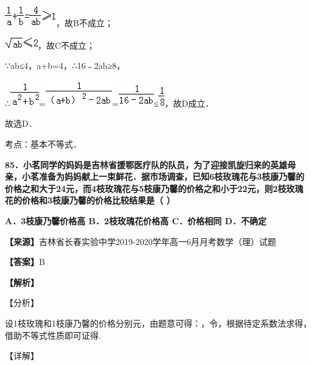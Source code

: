 \documentclass[
]{article}
\begin{document}
\includegraphics[width=0.87535in,height=0.36473in]{Fig//media/image860.png}，故B不成立；

\includegraphics[width=0.56273in,height=0.18758in]{Fig//media/image861.png}，故C不成立；

∵ab≤4，a+b=4，∴16﹣2ab≥8，

∴\includegraphics[width=0.48978in,height=0.42726in]{Fig//media/image862.png}=\includegraphics[width=1.13588in,height=0.4481in]{Fig//media/image863.png}=\includegraphics[width=0.60441in,height=0.39599in]{Fig//media/image864.png}≤\includegraphics[width=0.10421in,height=0.36473in]{Fig//media/image865.png}，故D成立．

故选D．

考点：基本不等式．

\textbf{85．小茗同学的妈妈是吉林省援鄂医疗队的队员，为了迎接凯旋归来的英雄母亲，小茗准备为妈妈献上一束鲜花．据市场调查，已知6枝玫瑰花与3枝康乃馨的价格之和大于24元，而4枝玫瑰花与5枝康乃馨的价格之和小于22元，则2枝玫瑰花的价格和3枝康乃馨的价格比较结果是（
）}

\textbf{A．3枝康乃馨价格高 B．2枝玫瑰花价格高 C．价格相同 D．不确定}

\textbf{【来源】}吉林省长春实验中学2019-2020学年高一6月月考数学（理）试题

\textbf{【答案】}B

\textbf{【解析】}

【分析】

设1枝玫瑰和1枝康乃馨的价格分别元，由题意可得：，令，根据待定系数法求得，借助不等式性质即可证得.

【详解】
\end{document}
